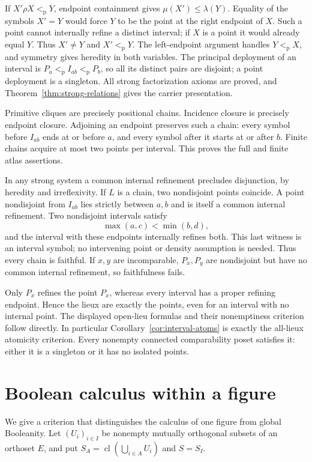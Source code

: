 \documentclass[11pt,a4paper]{article}
\theoremstyle{definition}
\newcommand{\cl}{\operatorname{cl}}
\begin{document}
If $X'\rho X<_{\mathrm p}Y$, endpoint containment gives
$\mu(X')\leq\lambda(Y)$. Equality of the symbols $X'=Y$
would force $Y$ to be the point at the right endpoint of $X$.
Such a point cannot internally refine a distinct interval; if
$X$ is a point it would already equal $Y$. Thus $X'\ne Y$
and $X'<_{\mathrm p}Y$. The left-endpoint argument handles
$Y<_{\mathrm p}X$, and symmetry gives heredity in both variables.
The principal deployment of an interval is
$P_a<_{\mathrm p}I_{ab}<_{\mathrm p}P_b$, so all its distinct
pairs are disjoint; a point deployment is a singleton.
All strong factorization axioms are proved, and
Theorem~\ref{thm:strong-relations} gives the carrier presentation.

Primitive cliques are precisely positional chains. Incidence
closure is precisely endpoint closure. Adjoining an endpoint
preserves such a chain: every symbol before $I_{ab}$ ends at or
before $a$, and every symbol after it starts at or after $b$.
Finite chains acquire at most two points per interval. This proves
the full and finite atlas assertions.

In any strong system a common internal refinement precludes
disjunction, by heredity and irreflexivity. If $L$ is a chain,
two nondisjoint points coincide. A point nondisjoint from $I_{ab}$
lies strictly between $a,b$ and is itself a common internal
refinement. Two nondisjoint intervals satisfy
\[
 \max(a,c)<\min(b,d),
\]
and the interval with these endpoints internally refines both.
This last witness is an interval symbol; no intervening point
or density assumption is needed. Thus every chain is faithful.
If $x,y$ are incomparable, $P_x,P_y$ are nondisjoint but have
no common internal refinement, so faithfulness fails.

Only $P_x$ refines the point $P_x$, whereas every interval has
a proper refining endpoint. Hence the lieux are exactly the
points, even for an interval with no internal point. The displayed
open-lieu formulas and their nonemptiness criterion follow directly.
In particular Corollary~\ref{cor:interval-atoms} is exactly the
all-lieux atomicity criterion. Every nonempty connected comparability
poset satisfies it: either it is a singleton or it has no isolated
points.

\section{Boolean calculus within a figure}
We give a criterion that distinguishes the calculus of one figure from global Booleanity. Let $(U_i)_{i\in I}$ be nonempty mutually orthogonal subsets of an orthoset $E$, and put $S_A=\cl(\bigcup_{i\in A}U_i)$ and $S=S_I$.
\end{document}
